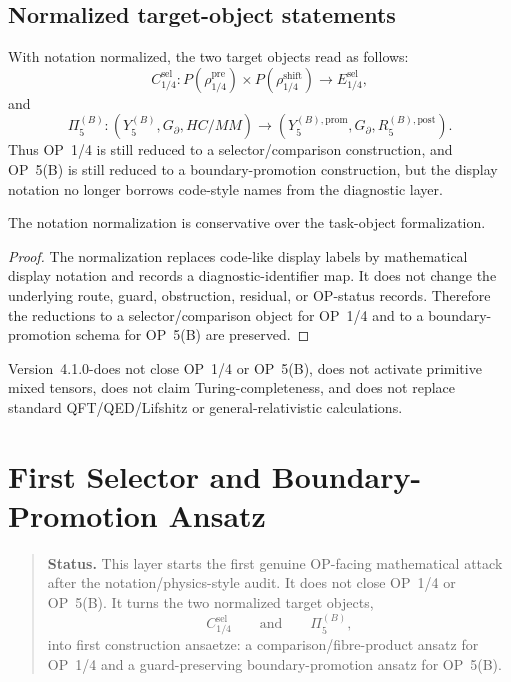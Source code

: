 \subsection{Normalized target-object statements}
\label{subsec:v410r05-normalized-target-object-statements}

With notation normalized, the two target objects read as follows:
\[
 C_{1/4}^{\mathrm{sel}}:
 P(\rho_{1/4}^{\mathrm{pre}})\times P(\rho_{1/4}^{\mathrm{shift}})
 \longrightarrow E_{1/4}^{\mathrm{sel}},
\]
and
\[
 \Pi_{5}^{(B)}:
 (Y_{5}^{(B)},G_{\partial},HC/MM)
 \longrightarrow
 (Y_{5}^{(B),\mathrm{prom}},G_{\partial},R_{5}^{(B),\mathrm{post}}).
\]
Thus OP~1/4 is still reduced to a selector/comparison construction, and
OP~5(B) is still reduced to a boundary-promotion construction, but the display
notation no longer borrows code-style names from the diagnostic layer.

\begin{theorem}
\label{thm:v410r05-notation-normalization-conservativity}
The notation normalization is conservative over the task-object
formalization.
\end{theorem}

\begin{proof}
The normalization replaces code-like display labels by mathematical display
notation and records a diagnostic-identifier map. It does not change the
underlying route, guard, obstruction, residual, or OP-status records. Therefore
the reductions to a selector/comparison object for OP~1/4 and to a
boundary-promotion schema for OP~5(B) are preserved.
\end{proof}

\begin{remark}
\label{rem:v410r05-non-claim}
Version~4.1.0-does not close OP~1/4 or OP~5(B), does not activate
primitive mixed tensors, does not claim Turing-completeness, and does not
replace standard QFT/QED/Lifshitz or general-relativistic calculations.
\end{remark}



\clearpage
\section{First Selector and Boundary-Promotion Ansatz}
\label{sec:v410r06-first-selector-boundary-promotion-ansatz}

\begin{quote}\small
\noindent\textbf{Status.}
This layer starts the first genuine OP-facing mathematical attack after the
notation/physics-style audit. It does not close OP~1/4 or OP~5(B). It turns
the two normalized target objects,
\[
 C_{1/4}^{\mathrm{sel}}
 \qquad\text{and}\qquad
 \Pi_{5}^{(B)},
\]
into first construction ansaetze: a comparison/fibre-product ansatz for
OP~1/4 and a guard-preserving boundary-promotion ansatz for OP~5(B).
\end{quote}

